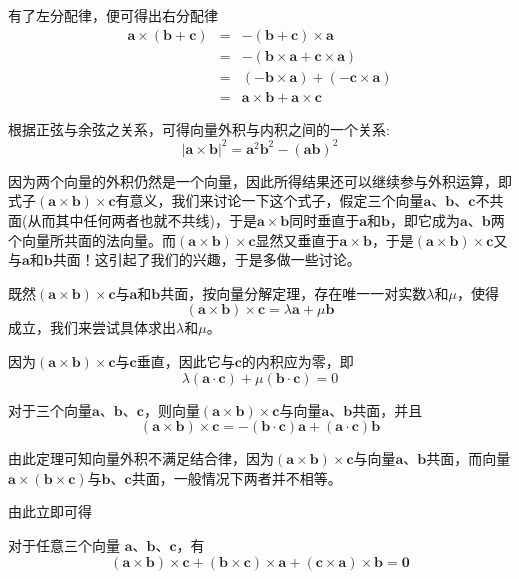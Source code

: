 有了左分配律，便可得出右分配律
\begin{eqnarray*}
  \bm{a} \times (\bm{b} + \bm{c}) & = & - (\bm{b} + \bm{c}) \times \bm{a} \\
                                  & = & - (\bm{b} \times \bm{a} + \bm{c} \times \bm{a}) \\
                                  & = & (-\bm{b}\times\bm{a}) + (-\bm{c}\times\bm{a}) \\
  & = & \bm{a}\times\bm{b} + \bm{a}\times\bm{c}
\end{eqnarray*}

根据正弦与余弦之关系，可得向量外积与内积之间的一个关系:
\[ |\bm a \times \bm b|^2 = \bm a^2 \bm b^2 - (\bm a \bm b)^2 \]

因为两个向量的外积仍然是一个向量，因此所得结果还可以继续参与外积运算，即式子$(\bm{a}\times\bm{b})\times\bm{c}$有意义，我们来讨论一下这个式子，假定三个向量$\bm{a}$、$\bm{b}$、$\bm{c}$不共面(从而其中任何两者也就不共线)，于是$\bm{a}\times\bm{b}$同时垂直于$\bm{a}$和$\bm{b}$，即它成为$\bm{a}$、$\bm{b}$两个向量所共面的法向量。而$(\bm{a}\times\bm{b})\times\bm{c}$显然又垂直于$\bm{a}\times\bm{b}$，于是$(\bm{a}\times\bm{b})\times\bm{c}$又与$\bm{a}$和$\bm{b}$共面！这引起了我们的兴趣，于是多做一些讨论。

既然$(\bm{a}\times\bm{b})\times\bm{c}$与$\bm{a}$和$\bm{b}$共面，按向量分解定理，存在唯一一对实数$\lambda$和$\mu$，使得
\[ (\bm{a}\times\bm{b})\times\bm{c}=\lambda \bm{a} + \mu \bm{b} \]
成立，我们来尝试具体求出$\lambda$和$\mu$。

因为$(\bm{a}\times\bm{b})\times\bm{c}$与$\bm{c}$垂直，因此它与$\bm{c}$的内积应为零，即
\[ \lambda (\bm{a} \cdot \bm{c}) + \mu (\bm{b} \cdot \bm{c}) = 0 \]

\begin{theorem}
  对于三个向量$\bm{a}$、$\bm{b}$、$\bm{c}$，则向量$(\bm{a}\times\bm{b})\times\bm{c}$与向量$\bm{a}$、$\bm{b}$共面，并且
  \[ (\bm{a}\times\bm{b})\times\bm{c} = -(\bm{b}\cdot\bm{c})\bm{a}+(\bm{a}\cdot\bm{c})\bm{b} \]
\end{theorem}

由此定理可知向量外积不满足结合律，因为$(\bm{a}\times\bm{b})\times\bm{c}$与向量$\bm{a}$、$\bm{b}$共面，而向量$\bm{a}\times(\bm{b}\times\bm{c})$与$\bm{b}$、$\bm{c}$共面，一般情况下两者并不相等。

由此立即可得
\begin{theorem}
  \label{theorem:rotation-sum-of-three-vector-outer-product}
  对于任意三个向量 $\bm a$、$\bm b$、$\bm c$，有
  \[ (\bm a \times \bm b) \times \bm c + (\bm b \times \bm c) \times \bm a + (\bm c \times \bm a) \times \bm b = \bm 0 \]
\end{theorem}


